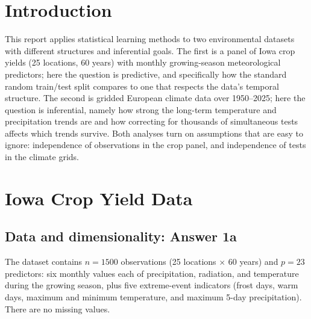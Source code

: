 \documentclass[11pt,a4paper]{article}
\begin{document}

\thispagestyle{empty}

\clearpage

\setcounter{page}{1}

\section{Introduction}

This report applies statistical learning methods to two environmental datasets
with different structures and inferential goals. The first is a panel of Iowa
crop yields (25 locations, 60 years) with monthly growing-season meteorological
predictors; here the question is predictive, and specifically how the standard
random train/test split compares to one that respects the data's temporal
structure. The second is gridded European climate data over 1950--2025; here the
question is inferential, namely how strong the long-term temperature and
precipitation trends are and how correcting for thousands of simultaneous tests
affects which trends survive. Both analyses turn on assumptions that are easy to
ignore: independence of observations in the crop panel, and independence of
tests in the climate grids.

\section{Iowa Crop Yield Data}

\subsection{Data and dimensionality: Answer 1a}

The dataset contains $n = 1500$ observations (25 locations $\times$ 60 years) and
$p = 23$ predictors: six monthly values each of precipitation, radiation, and
temperature during the growing season, plus five extreme-event indicators (frost
days, warm days, maximum and minimum temperature, and maximum 5-day
precipitation). There are no missing values.
\end{document}
